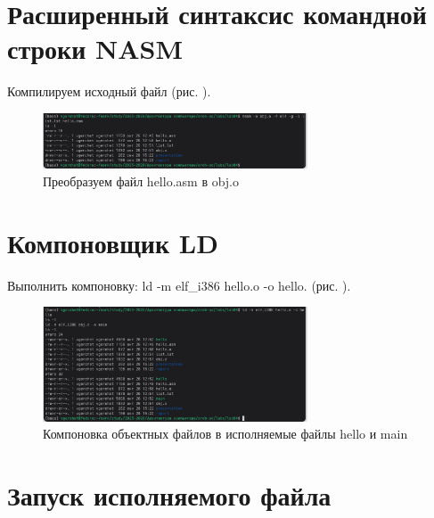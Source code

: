 \documentclass[
  12pt,
  a4paper,
  DIV=11,
  numbers=noendperiod]{scrreprt}
\begin{document}
\section{Расширенный синтаксис командной строки
NASM}\label{ux440ux430ux441ux448ux438ux440ux435ux43dux43dux44bux439-ux441ux438ux43dux442ux430ux43aux441ux438ux441-ux43aux43eux43cux430ux43dux434ux43dux43eux439-ux441ux442ux440ux43eux43aux438-nasm}

Компилируем исходный файл (рис. \textcite{fig:005}).

\begin{figure}

{\centering \includegraphics[width=0.7\textwidth,height=\textheight]{image/5.png}

}

\caption{Преобразуем файл hello.asm в obj.o}

\end{figure}%

\section{Компоновщик
LD}\label{ux43aux43eux43cux43fux43eux43dux43eux432ux449ux438ux43a-ld}

Выполнить компоновку: ld -m elf\_i386 hello.o -o hello. (рис.
\textcite{fig:006}).

\begin{figure}

{\centering \includegraphics[width=0.7\textwidth,height=\textheight]{image/6.png}

}

\caption{Компоновка объектных файлов в исполняемые файлы hello и main}

\end{figure}%

\section{Запуск исполняемого
файла}\label{ux437ux430ux43fux443ux441ux43a-ux438ux441ux43fux43eux43bux43dux44fux435ux43cux43eux433ux43e-ux444ux430ux439ux43bux430}
\end{document}
